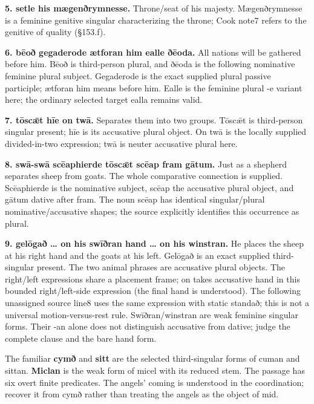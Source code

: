 \textbf{5. setle his mægenðrymnesse.} Throne/\allowbreak{}seat of his majesty. Mægenðrymnesse is a feminine genitive singular characterizing the throne; Cook note7 refers to the genitive of quality (§153.f).

\textbf{6. bēoð gegaderode ætforan him ealle ðēoda.} All nations will be gathered before him. Bēoð is third-person plural, and ðēoda is the following nominative feminine plural subject. Gegaderode is the exact supplied plural passive participle; ætforan him means before him. Ealle is the feminine plural -e variant here; the ordinary selected target ealla remains valid.

\textbf{7. tōscǣt hīe on twā.} Separates them into two groups. Tōscǣt is third-person singular present; hīe is its accusative plural object. On twā is the locally supplied divided-in-two expression; twā is neuter accusative plural here.

\textbf{8. swā-swā scēaphierde tōscǣt scēap fram gātum.} Just as a shepherd separates sheep from goats. The whole comparative connection is supplied. Scēaphierde is the nominative subject, scēap the accusative plural object, and gātum dative after fram. The noun scēap has identical singular/\allowbreak{}plural nominative/\allowbreak{}accusative shapes; the source explicitly identifies this occurrence as plural.

\textbf{9. gelōgað … on his swīðran hand … on his winstran.} He places the sheep at his right hand and the goats at his left. Gelōgað is an exact supplied third-singular present. The two animal phrases are accusative plural objects. The right/\allowbreak{}left expressions share a placement frame; on takes accusative hand in this bounded right/\allowbreak{}left-side expression (the final hand is understood). The following unassigned source line8 uses the same expression with static standað; this is not a universal motion-versus-rest rule. Swīðran/\allowbreak{}winstran are weak feminine singular forms. Their -an alone does not distinguish accusative from dative; judge the complete clause and the bare hand form.

The familiar \textbf{cymð} and \textbf{sitt} are the selected third-singular forms of cuman and sittan. \textbf{Miclan} is the weak form of micel with its reduced stem. The passage has six overt finite predicates. The angels' coming is understood in the coordination; recover it from cymð rather than treating the angels as the object of mid.

